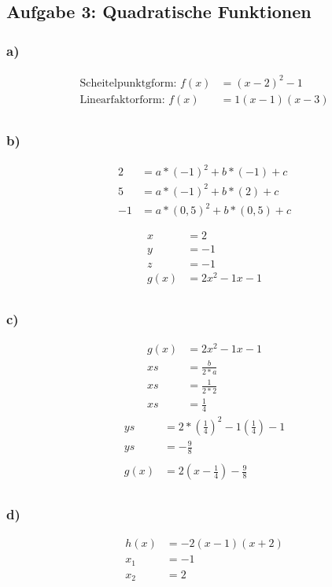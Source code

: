 \documentclass[a4paper, 10pt]{scrartcl}
\begin{document}
\subsection*{\textbf{Aufgabe 3: Quadratische Funktionen}}
	\begin{minipage}{0.5\textwidth}
		\subsubsection*{a)}
		\begin{align*}	
			\text{Scheitelpunktgform: }f(x) &= (x - 2)^{2} - 1 \\	
			\text{Linearfaktorform: } f(x) &= 1(x - 1)(x - 3)	\\ 
		\end{align*}
		\subsubsection*{b)}
		\begin{align*}
			2 &= a * (-1)^{2} + b * (-1) + c \\
			5 &= a * (-1)^{2} + b * (2)  + c \\
			-1 &= a * (0,5)^{2} + b * (0,5) + c\\ \\
		\end{align*}
		\begin{align*}
			x &= 2 \\
			y &= -1 \\ 
			z &= -1 \\
			g(x) &= 2x^{2} - 1x -1\\
		\end{align*}
		\subsubsection*{c)}
		\begin{align*}
			g(x) &= 2x^{2} - 1x -1\\
			xs &= \frac{b}{2 * a} \\
			xs &= \frac{1}{2 * 2} \\
			xs &= \frac{1}{4}
		\end{align*}
		\begin{align*}
			ys &=  2 * (\frac{1}{4})^{2} - 1(\frac{1}{4}) - 1 \\
			ys &= -\frac{9}{8} \\ \\
			g(x) &= 2 (x - \frac{1}{4}) - \frac{9}{8} \\
		\end{align*}
		\subsubsection*{d)}
		\begin{align*}
			h(x) &= -2(x - 1)(x + 2)\\
			x_{1}&= -1 \\
			x_{2}&= 2 \\
		\end{align*}
	\end{minipage}
\end{document}
